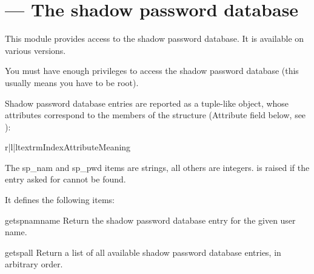 \section{ ---
         The shadow password database}


This module provides access to the \UNIX{} shadow password database.
It is available on various \UNIX{} versions.

You must have enough privileges to access the shadow password database
(this usually means you have to be root).

Shadow password database entries are reported as a tuple-like object, whose
attributes correspond to the members of the  structure
(Attribute field below, see ):

\begin{tableiii}{r|l|l}{textrm}{Index}{Attribute}{Meaning}
\end{tableiii}

The sp_nam and sp_pwd items are strings, all others are integers.
 is raised if the entry asked for cannot be found.

It defines the following items:

\begin{funcdesc}{getspnam}{name}
Return the shadow password database entry for the given user name.
\end{funcdesc}

\begin{funcdesc}{getspall}{}
Return a list of all available shadow password database entries, in arbitrary order.
\end{funcdesc}


\begin{seealso}
\end{seealso}
